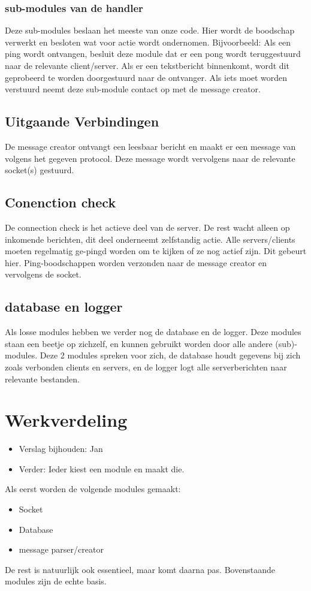 \documentclass[a4paper,10pt]{article}
\begin{document}
  \subsubsection{sub-modules van de handler}
  Deze sub-modules beslaan het meeste van onze code. Hier wordt de boodschap verwerkt en besloten wat voor actie wordt ondernomen. Bijvoorbeeld: Als een ping wordt ontvangen, besluit deze module dat er een pong wordt teruggestuurd naar de relevante client/server. Als er een tekstbericht binnenkomt, wordt dit geprobeerd te worden doorgestuurd naar de ontvanger. Als iets moet worden verstuurd neemt deze sub-module contact op met de message creator.

  \subsection{Uitgaande Verbindingen}
  De message creator ontvangt een leesbaar bericht en maakt er een message van volgens het gegeven protocol. Deze message wordt vervolgens naar de relevante socket(s) gestuurd.

  \subsection{Conenction check}
  De connection check is het actieve deel van de server. De rest wacht alleen op inkomende berichten, dit deel onderneemt zelfstandig actie. Alle servers/clients moeten regelmatig ge-pingd worden om te kijken of ze nog actief zijn. Dit gebeurt hier. Ping-boodschappen worden verzonden naar de message creator en vervolgens de socket.

  \subsection{database en logger}
  Als losse modules hebben we verder nog de database en de logger. Deze modules staan een beetje op zichzelf, en kunnen gebruikt worden door alle andere (sub)-modules. Deze 2 modules spreken voor zich, de database houdt gegevens bij zich zoals verbonden clients en servers, en de logger logt alle serverberichten naar relevante bestanden.


  \section{Werkverdeling}
  \begin{itemize}
    \item Verslag bijhouden: Jan
    \item Verder: Ieder kiest een module en maakt die.
  \end{itemize}
  Als eerst worden de volgende modules gemaakt:
\begin{itemize}
 \item Socket
  \item Database
  \item message parser/creator
\end{itemize}
  De rest is natuurlijk ook essentieel, maar komt daarna pas. Bovenstaande modules zijn de echte basis.
\end{document}
